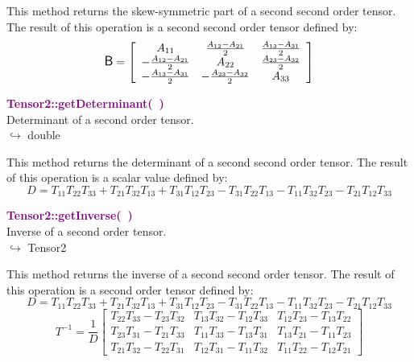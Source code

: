 This method returns the skew-symmetric part of a second second order tensor.
The result of this operation is a second second order tensor defined by:
\begin{equation*}
\mbox{\large\ensuremath{\mathsf{B}}} = \left[\begin{array}{ccc}
 A_{11} & \frac{A_{12} - A_{21}}{2} & \frac{A_{13} - A_{31}}{2}\\
 -\frac{A_{12} -  A_{21}}{2} & A_{22} & \frac {A_{23} - A_{32}}{2}\\
 -\frac{A_{13} - A_{31}}{2} & -\frac {A_{23} - A_{32}}{2} & A_{33}\end{array}
\right]
\end{equation*}

\textcolor{purple}{\textbf{Tensor2::getDeterminant(~)}}\label{Tensor2::getDeterminant()}\\
Determinant of a second order tensor.\\ \hspace*{10mm}$\hookrightarrow$ double

This method returns the determinant of a second second order tensor.
The result of this operation is a scalar value defined by:
\begin{equation*}
D = T_{11} T_{22} T_{33} + T_{21} T_{32} T_{13} + T_{31} T_{12} T_{23} - T_{31} T_{22} T_{13} - T_{11} T_{32} T_{23} - T_{21} T_{12} T_{33}
\end{equation*}

\textcolor{purple}{\textbf{Tensor2::getInverse(~)}}\label{Tensor2::getInverse()}\\
Inverse of a second order tensor.\\ \hspace*{10mm}$\hookrightarrow$ Tensor2

This method returns the inverse of a second second order tensor.
The result of this operation is a second order tensor defined by:
\begin{equation*}
D = T_{11} T_{22} T_{33} + T_{21} T_{32} T_{13} + T_{31} T_{12} T_{23} - T_{31} T_{22} T_{13} - T_{11} T_{32} T_{23} - T_{21} T_{12} T_{33}
\end{equation*}
\begin{equation*}
T^{-1} = \frac {1}{D} \left[\begin{array}{ccc}
  T_{22}T_{33}-T_{23}T_{32}&T_{13}T_{32}-T_{12}T_{33}&T_{12}T_{23}-T_{13}T_{22}\\
  T_{23}T_{31}-T_{21}T_{33}&T_{11}T_{33}-T_{13}T_{31}&T_{13}T_{21}-T_{11}T_{23}\\
  T_{21}T_{32}-T_{22}T_{31}&T_{12}T_{31}-T_{11}T_{32}&T_{11}T_{22}-T_{12}T_{21}
  \end{array}
  \right]
\end{equation*}


